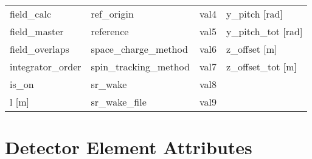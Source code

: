 \begin{tabular}{llll}
field_calc                       & ref_origin                       & val4                             & y_pitch [rad]                    \\
field_master                     & reference                        & val5                             & y_pitch_tot [rad]                \\
field_overlaps                   & space_charge_method              & val6                             & z_offset [m]                     \\
integrator_order                 & spin_tracking_method             & val7                             & z_offset_tot [m]                 \\
is_on                            & sr_wake                          & val8                             &                                  \\
l [m]                            & sr_wake_file                     & val9                             &                                  \\
 \bottomrule
 \end{tabular}
 \vfill
 
 \section{Detector Element Attributes}
 \label{s:list.detector}
 
